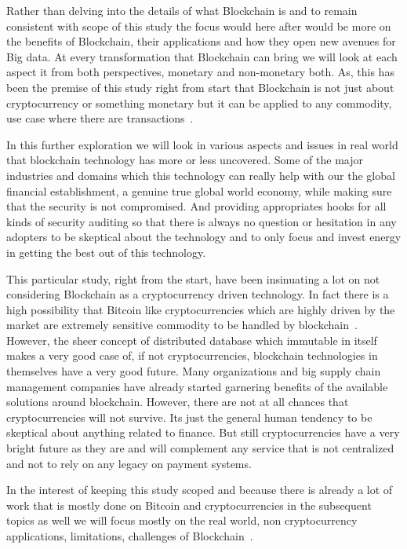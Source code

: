 Rather than delving into the details of what Blockchain is and to
remain consistent with scope of this study the focus would here after
would be more on the benefits of Blockchain, their applications and
how they open new avenues for Big data. At every transformation that
Blockchain can bring we will look at each aspect it from both
perspectives, monetary and non-monetary both. As, this has been the
premise of this study right from start that Blockchain is not just
about cryptocurrency or something monetary but it can be applied to
any commodity, use case where there are transactions~\cite{beck13}.

In this further exploration we will look in various aspects and issues
in real world that blockchain technology has more or less uncovered.
Some of the major industries and domains which this technology can
really help with our the global financial establishment, a genuine
true global world economy, while making sure that the security is not
compromised. And providing appropriates hooks for all kinds of
security auditing so that there is always no question or hesitation in
any adopters to be skeptical about the technology and to only focus
and invest energy in getting the best out of this technology.

This particular study, right from the start, have been insinuating a
lot on not considering Blockchain as a cryptocurrency driven
technology. In fact there is a high possibility that Bitcoin like
cryptocurrencies which are highly driven by the market are extremely
sensitive commodity to be handled by blockchain~\cite{iyke5}. However,
the sheer concept of distributed database which immutable in itself
makes a very good case of, if not cryptocurrencies, blockchain
technologies in themselves have a very good future. Many organizations
and big supply chain management companies have already started
garnering benefits of the available solutions around blockchain.
However, there are not at all chances that cryptocurrencies will not
survive. Its just the general human tendency to be skeptical about
anything related to finance. But still cryptocurrencies have a very
bright future as they are and will complement any service that is not
centralized and not to rely on any legacy on payment systems.

In the interest of keeping this study scoped and because there is
already a lot of work that is mostly done on Bitcoin and
cryptocurrencies in the subsequent topics as well we will focus mostly
on the real world, non cryptocurrency applications, limitations,
challenges of Blockchain~\cite{yli18}.


